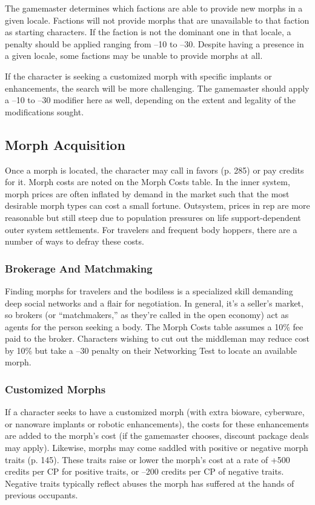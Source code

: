 The gamemaster determines which factions are able to provide new morphs in a given locale. Factions will not provide morphs that are unavailable to that faction as starting characters. If the faction is not the dominant one in that locale, a penalty should be applied ranging from –10 to –30. Despite having a presence in a given locale, some factions may be unable to provide morphs at all. 

If the character is seeking a customized morph with specific implants or enhancements, the search will be more challenging. The gamemaster should apply a –10 to –30 modifier here as well, depending on the extent and legality of the modifications sought. 

\subsection{Morph Acquisition} 

Once a morph is located, the character may call in favors (p. 285) or pay credits for it. Morph costs are noted on the Morph Costs table. In the inner system, morph prices are often inflated by demand in the market such that the most desirable morph types can cost a small fortune. Outsystem, prices in rep are more reasonable but still steep due to population pressures on life support-dependent outer system settlements. For travelers and frequent body hoppers, there are a number of ways to defray these costs. 

\subsubsection{Brokerage And Matchmaking} 

Finding morphs for travelers and the bodiless is a specialized skill demanding deep social networks and a flair for negotiation. In general, it's a seller's market, so brokers (or ``matchmakers,'' as they're called in the open economy) act as agents for the person seeking a body. The Morph Costs table assumes a 10\% fee paid to the broker. Characters wishing to cut out the middleman may reduce cost by 10\% but take a –30 penalty on their Networking Test to locate an available morph. 

\subsubsection{Customized Morphs} 

If a character seeks to have a customized morph (with extra bioware, cyberware, or nanoware implants or robotic enhancements), the costs for these enhancements are added to the morph's cost (if the gamemaster chooses, discount package deals may apply). Likewise, morphs may come saddled with positive or negative morph traits (p. 145). These traits raise or lower the morph's cost at a rate of +500 credits per CP for positive traits, or –200 credits per CP of negative traits. Negative traits typically reflect abuses the morph has suffered at the hands of previous occupants. 


